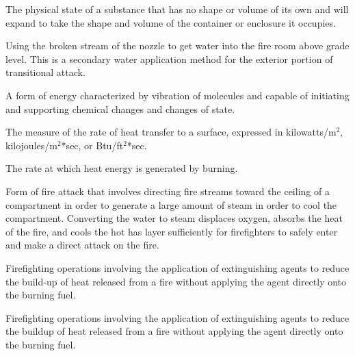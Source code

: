 \begin{description}
\item[Gas] \hfill
\begin{description}[leftmargin=!]
	\item The physical state of a substance that has no shape or volume of its own and will expand to take the shape and volume of the container or enclosure it occupies.
\end{description}

\item[Half Bale] \hfill
\begin{description}[leftmargin=!]
	\item Using the broken stream of the nozzle to get water into the fire room above grade level. This is a secondary water application method for the exterior portion of transitional attack.
\end{description}

\item[Heat] \hfill
\begin{description}[leftmargin=!]
	\item A form of energy characterized by vibration of molecules and capable of initiating and supporting chemical changes and changes of state.
\end{description}

\item[Heat Flux] \hfill
\begin{description}[leftmargin=!]
	\item The measure of the rate of heat transfer to a surface, expressed in kilowatts/m$^2$, kilojoules/m$^2$*sec, or Btu/ft$^2$*sec.
\end{description}

\hypertarget{HRR}{\item[Heat Release Rate (HRR)]} \hfill
\begin{description}[leftmargin=!]
	\item The rate at which heat energy is generated by burning.
\end{description}

\item[Indirect Attack] \hfill
\begin{description}[leftmargin=!]
	\item Form of fire attack that involves directing fire streams toward the ceiling of a compartment in order to generate a large amount of steam in order to cool the compartment.  Converting the water to steam displaces oxygen, absorbs the heat of the fire, and cools the hot has layer sufficiently for firefighters to safely enter and make a direct attack on the fire.  
	\item Firefighting operations involving the application of extinguishing agents to reduce the build-up of heat released from a fire without applying the agent directly onto the burning fuel.
	\item Firefighting operations involving the application of extinguishing agents to reduce the buildup of heat released from a fire without applying the agent directly onto the burning fuel.
\end{description}


\end{description}
